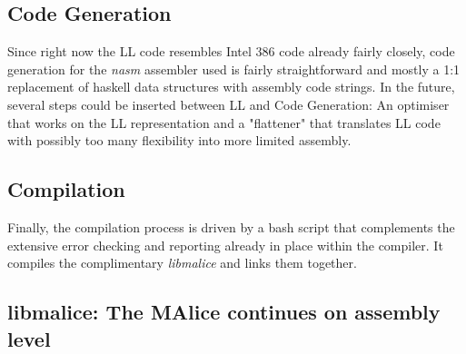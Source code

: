\documentclass[a4paper]{article}
\begin{document}
\subsection{Code Generation}

Since right now the LL code resembles Intel 386 code already fairly closely,
code generation for the \emph{nasm} assembler used is fairly straightforward
and mostly a 1:1 replacement of haskell data structures with assembly code strings.
In the future, several steps could be inserted between LL and Code Generation:
An optimiser that works on the LL representation and a "flattener" that
translates LL code with possibly too many flexibility into more limited
assembly.


\subsection{Compilation}

Finally, the compilation process is driven by a bash script that complements
the extensive error checking and reporting already in place within the compiler.
It compiles the complimentary \emph{libmalice} and links them together.


\subsection{libmalice: The MAlice continues on assembly level}
\end{document}
